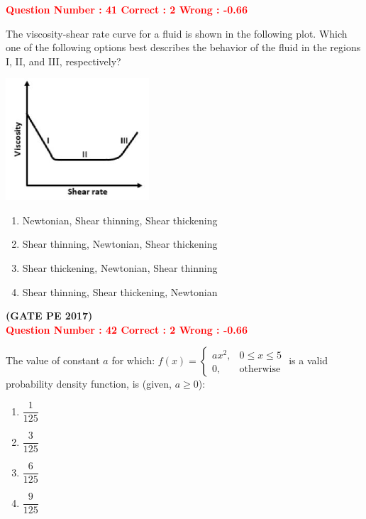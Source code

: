 \documentclass[12pt]{article}
\begin{document}
{\newpage

\textcolor{red}{\textbf{Question Number : 41 \hfill Correct : 2  Wrong : -0.66}}

The viscosity-shear rate curve for a fluid is shown in the following plot. Which one of the following options best describes the behavior of the fluid in the regions I, II, and III, respectively?

\begin{center}
    \includegraphics[width=0.4\textwidth]{Figs/Graph_Q41.png}
\end{center}

\begin{enumerate}[label=(\Alph*)]
    \item Newtonian, Shear thinning, Shear thickening
    \item Shear thinning, Newtonian, Shear thickening
    \item Shear thickening, Newtonian, Shear thinning
    \item Shear thinning, Shear thickening, Newtonian
\end{enumerate}

\hfill\textbf{(GATE PE 2017)}\\[0.6cm]

\textcolor{red}{\textbf{Question Number : 42 \hfill Correct : 2  Wrong : -0.66}}

The value of constant $a$ for which:
{\LARGE$ 
f(x) = \begin{cases}
ax^2, & 0 \leq x \leq 5 \\
0, & \text{otherwise}
\end{cases}
$}
is a valid probability density function, is (given, $a \geq 0$):

\begin{enumerate}[label=(\Alph*)]
    \item $\dfrac{1}{125}$
    \item $\dfrac{3}{125}$
    \item $\dfrac{6}{125}$
    \item $\dfrac{9}{125}$
\end{enumerate}

}
\end{document}
